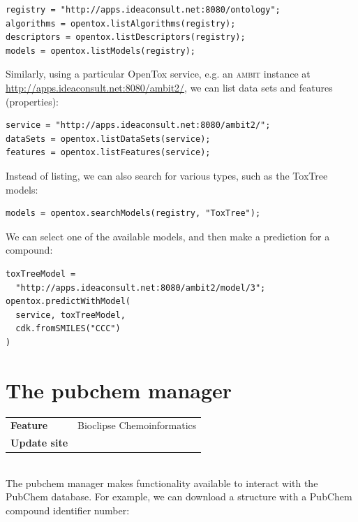 \documentclass{book}
\begin{document}
\begin{refsection}
\begin{Verbatim}
registry = "http://apps.ideaconsult.net:8080/ontology";
algorithms = opentox.listAlgorithms(registry);
descriptors = opentox.listDescriptors(registry);
models = opentox.listModels(registry);
\end{Verbatim}

Similarly, using a particular OpenTox service, e.g. an \textsc{ambit}
instance at
\url{http://apps.ideaconsult.net:8080/ambit2/}\cite{jeliazkova2011ambit},
we can list data sets
and features (properties):

\begin{Verbatim}
service = "http://apps.ideaconsult.net:8080/ambit2/";
dataSets = opentox.listDataSets(service);
features = opentox.listFeatures(service);
\end{Verbatim}

Instead of listing, we can also search for various types, such as
the ToxTree models\cite{patlewicz2008evaluation}:

\begin{Verbatim}
models = opentox.searchModels(registry, "ToxTree");
\end{Verbatim}

We can select one of the available models, and then make a prediction
for a compound:

\begin{Verbatim}
toxTreeModel =
  "http://apps.ideaconsult.net:8080/ambit2/model/3";
opentox.predictWithModel(
  service, toxTreeModel,
  cdk.fromSMILES("CCC")
)
\end{Verbatim}

\section{The pubchem manager}

\begin{tabular}{ll}
\textbf{Feature} & Bioclipse Chemoinformatics \\
\textbf{Update site} & \url{} \\
\end{tabular} \\

The pubchem manager makes functionality available to interact
with the PubChem database. For example, we
can download a structure with a PubChem compound identifier
number:


\end{refsection}
\end{document}
